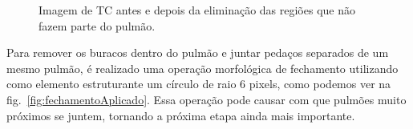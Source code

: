\begin{figure}[!ht]
 \begin{center}
 \end{center}
 \caption{Imagem de TC antes e depois da eliminação das regiões que não fazem parte do pulmão.}
 \label{fig:clean}
\end{figure}

Para remover os buracos dentro do pulmão e juntar pedaços separados de um mesmo pulmão, é realizado uma operação morfológica de fechamento utilizando como elemento estruturante um círculo de raio 6 pixels, como podemos ver na fig.~\ref{fig:fechamentoAplicado}. Essa operação pode causar com que pulmões muito próximos se juntem, tornando a próxima etapa ainda mais importante.

